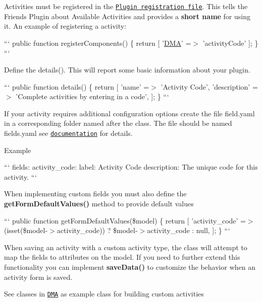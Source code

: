 Activities must be registered in the \href{#registration-file}{\tt Plugin registration file}. This tells the Friends Plugin about Available Activities and provides a {\bfseries short name} for using it. An example of registering a activity\+:

``` public function register\+Components() \{ return \mbox{[} '\hyperlink{namespaceDMA}{D\+M\+A}' =$>$ 'activity\+Code' \mbox{]}; \} ```

Define the details(). This will report some basic information about your plugin.

``` public function details() \{ return \mbox{[} 'name' =$>$ 'Activity Code', 'description' =$>$ 'Complete activities by entering in a code', \mbox{]}; \} ```

If your activity requires additional configuration options create the file field.\+yaml in a corresponding folder named after the class. The file should be named fields.\+yaml see \href{https://octobercms.com/docs/backend/forms#field-types}{\tt documentation} for details.

Example

``` fields\+: activity\+\_\+code\+: label\+: Activity Code description\+: The unique code for this activity. ```

When implementing custom fields you must also define the {\bfseries get\+Form\+Default\+Values()} method to provide default values

``` public function get\+Form\+Default\+Values(\$model) \{ return \mbox{[} 'activity\+\_\+code' =$>$ (isset(\$model-\/$>$activity\+\_\+code)) ? \$model-\/$>$activity\+\_\+code \+: null, \mbox{]}; \} ```

When saving an activity with a custom activity type, the class will attempt to map the fields to attributes on the model. If you need to further extend this functionality you can implement {\bfseries save\+Data()} to customize the behavior when an activity form is saved.

See classes in \href{https://github.com/DallasMuseumArt/OctoberFriends/tree/master/activities}{\tt D\+M\+A} as example class for building custom activities 